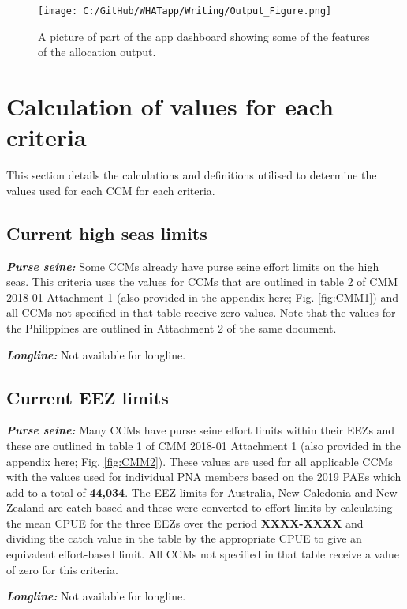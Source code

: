 \documentclass[11pt]{article}
\begin{document}
 \begin{figure} [h]
  \centering
\texttt{[image: C:/GitHub/WHATapp/Writing/Output\_Figure.png]}
  \caption {A picture of part of the app dashboard showing some of the features of the allocation output.}
  \label{fig:outputpic}
\end{figure}


\section{Calculation of values for each criteria} \label{sec:scendet}
This section details the calculations and definitions utilised to determine the values used for each CCM for each criteria. 

\subsection*{Current high seas limits}
\noindent\textbf{\emph{Purse seine:}}
Some CCMs already have purse seine effort limits on the high seas. This criteria uses the values for CCMs that are outlined in table 2 of CMM 2018-01 Attachment 1  (also provided in the appendix here; Fig. \ref{fig:CMM1}) and all CCMs not specified in that table receive zero values. Note that the values for the Philippines are outlined in Attachment 2 of the same document.

\noindent\textbf{\emph{Longline:}}
Not available for longline.

\subsection*{Current EEZ limits}
\noindent\textbf{\emph{Purse seine:}}
Many CCMs have purse seine effort limits within their EEZs and these are outlined in table 1 of CMM 2018-01 Attachment 1  (also provided in the appendix here; Fig. \ref{fig:CMM2}). These values are used for all applicable CCMs with the values used for individual PNA members based on the 2019 PAEs which add to a total of {\bf 44,034}. The EEZ limits for Australia, New Caledonia and New Zealand are catch-based and these were converted to effort limits by calculating the mean CPUE for the three EEZs over the period {\bf XXXX-XXXX} and dividing the catch value in the table by the appropriate CPUE to give an equivalent effort-based limit. All CCMs not specified in that table receive a value of zero for this criteria.

\noindent\textbf{\emph{Longline:}}
Not available for longline.
\end{document}

